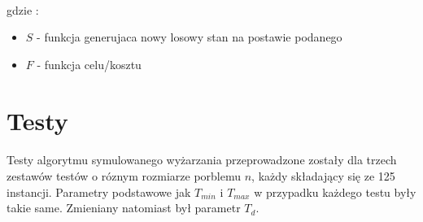 \documentclass[wide,a4paper,titlepage,12pt] {article}
\begin{document}
\lstset{ %
    language=java,                %
    basicstyle=\scriptsize,       %
    numbers=left,                   %
    numberstyle=\scriptsize,      %
    stepnumber=10,                   %
    numbersep=9pt,                  %
    showspaces=false,               %
    showstringspaces=false,         %
    showtabs=false,                 %
    breaklines=true,                %
    }
    
\paragraph{}
gdzie :
\begin{itemize}
  \item $S$ - funkcja generujaca nowy losowy stan na postawie podanego
  \item $F$ - funkcja celu/kosztu
\end{itemize}
\newpage
\section{Testy}
\paragraph{}
Testy algorytmu symulowanego wyżarzania przeprowadzone zostały dla trzech zestawów testów o róznym rozmiarze porblemu $n$, każdy składający się ze 125 instancji. Parametry podstawowe jak $T_{min}$ i $T_{max}$ w przypadku każdego testu były takie same. Zmieniany natomiast był parametr $T_{d}$.
\end{document}

